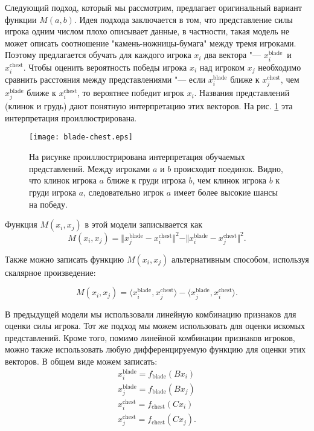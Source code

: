 \documentclass[12pt,a4paper]{article}
\begin{document}
Следующий подход, который мы рассмотрим, предлагает оригинальный вариант функции $M(a,b)$. Идея подхода заключается в том, что представление силы игрока одним числом плохо описывает данные, в частности, такая модель не может описать соотношение "камень-ножницы-бумага" между тремя игроками. Поэтому предлагается обучать для каждого игрока $x_i$ два вектора "--- $x_i^{\text{blade}}$~и~$x_i^{\text{chest}}$. Чтобы оценить вероятность победы игрока $x_i$ над игроком $x_j$ необходимо сравнить расстояния между представлениями "--- если $x_i^{\text{blade}}$ ближе к $x_j^{\text{chest}}$, чем $x_j^{\text{blade}}$ ближе к $x_i^{\text{chest}}$, то вероятнее победит игрок $x_i$. Названия представлений (клинок и грудь) дают понятную интерпретацию этих векторов. На рис. \ref{blade-chest} эта интерпретация проиллюстрирована.

\begin{figure}[h!]
\centering
\texttt{[image: blade-chest.eps]}
\caption{На рисунке проиллюстрирована интерпретация обучаемых представлений. Между игроками $a$ и $b$ происходит поединок. Видно, что клинок игрока $a$ ближе к груди игрока $b$, чем клинок игрока $b$ к груди игрока $a$, следовательно игрок $a$ имеет более высокие шансы на победу.}
\label{blade-chest}
\end{figure}

Функция $M(x_i,x_j)$ в этой модели записывается как
\begin{equation*}
	M(x_i, x_j) = \Vert x_j^{\text{blade}} - x_i^{\text{chest}} \Vert^2 - \Vert x_i^{\text{blade}} - x_j^{\text{chest}} \Vert^2.
\end{equation*}
\newpage

Также можно записать функцию $M(x_i,x_j)$ альтернативным способом, используя скалярное произведение:

\begin{equation*}
	M(x_i, x_j) = \langle x_i^{\text{blade}}, x_j^{\text{chest}} \rangle - \langle x_j^{\text{blade}}, x_i^{\text{chest}} \rangle.
\end{equation*}

В предыдущей модели мы использовали линейную комбинацию признаков для оценки силы игрока. Тот же подход мы можем использовать для оценки искомых представлений. Кроме того, помимо линейной комбинации признаков игроков, можно также использовать любую дифференцируемую функцию для оценки этих векторов. В общем виде можем записать:
\begin{align*}
	x_i^{\text{blade}} = f_{\text{blade}}(B x_i)\\
	x_j^{\text{blade}} = f_{\text{blade}}(B x_j)\\
	x_i^{\text{chest}} = f_{\text{chest}}(C x_i)\\
	x_j^{\text{chest}} = f_{\text{chest}}(C x_j).
\end{align*}
\end{document}
